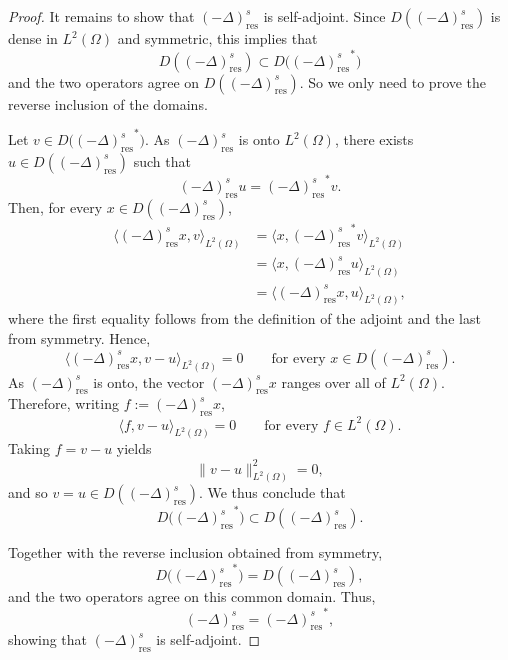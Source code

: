 \documentclass[preprint,12pt]{elsarticle}
\begin{document}
\begin{proof}
It remains to show that $(-\Delta)^s_{\mathrm{res}}$ is self-adjoint.
Since $D((-\Delta)^s_{\mathrm{res}})$ is dense in $L^2(\Omega)$ and symmetric, this implies that  
\[
    D((-\Delta)^s_{\mathrm{res}})
    \subset
    D\bigl({(-\Delta)^s_{\mathrm{res}}}^*\bigr)
\]
and the two operators agree on $D((-\Delta)^s_{\mathrm{res}})$. So we only need to prove the reverse inclusion of the
domains.

Let $v\in D\bigl({(-\Delta)^s_{\mathrm{res}}}^*\bigr)$. As $(-\Delta)^s_{\mathrm{res}}$ is onto $L^2(\Omega)$, there exists
$u\in D((-\Delta)^s_{\mathrm{res}})$ such that
\[
    (-\Delta)^s_{\mathrm{res}}u
    =
    {(-\Delta)^s_{\mathrm{res}}}^*v.
\]
Then, for every $x\in D((-\Delta)^s_{\mathrm{res}})$,
\begin{align*}
    \langle (-\Delta)^s_{\mathrm{res}}x,v\rangle_{L^2(\Omega)}
    &=
    \langle x,{(-\Delta)^s_{\mathrm{res}}}^*v\rangle_{L^2(\Omega)} \\
    &=
    \langle x,(-\Delta)^s_{\mathrm{res}}u\rangle_{L^2(\Omega)} \\
    &=
    \langle (-\Delta)^s_{\mathrm{res}}x,u\rangle_{L^2(\Omega)},
\end{align*}
where the first equality follows from the definition of the adjoint
and the last from symmetry. Hence,
\[
    \langle (-\Delta)^s_{\mathrm{res}}x,v-u\rangle_{L^2(\Omega)}
    =
    0
    \qquad
    \text{for every }x\in D((-\Delta)^s_{\mathrm{res}}).
\]
As $(-\Delta)^s_{\mathrm{res}}$ is onto, the vector
$(-\Delta)^s_{\mathrm{res}}x$ ranges over all of $L^2(\Omega)$.
Therefore, writing $f:=(-\Delta)^s_{\mathrm{res}}x$,
\[
    \langle f,v-u\rangle_{L^2(\Omega)}
    =
    0
    \qquad
    \text{for every }f\in L^2(\Omega).
\]
Taking $f=v-u$ yields
\[
    \|v-u\|_{L^2(\Omega)}^2=0,
\]
and so $v=u\in D((-\Delta)^s_{\mathrm{res}})$. We thus conclude that
\[
    D\bigl({(-\Delta)^s_{\mathrm{res}}}^*\bigr)
    \subset
    D((-\Delta)^s_{\mathrm{res}}).
\]

Together with the reverse inclusion obtained from symmetry,
\[
    D\bigl({(-\Delta)^s_{\mathrm{res}}}^*\bigr)
    =
    D((-\Delta)^s_{\mathrm{res}}),
\]
and the two operators agree on this common domain. Thus,
\[
    (-\Delta)^s_{\mathrm{res}}
    =
    {(-\Delta)^s_{\mathrm{res}}}^*,
\]
showing that $(-\Delta)^s_{\mathrm{res}}$ is self-adjoint.
\end{proof}
\end{document}
